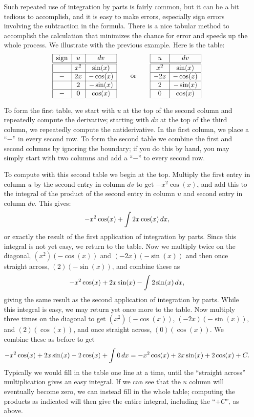 Such repeated use of integration by parts is fairly common, but it can
be a bit tedious to accomplish, and it is easy to make
errors, especially sign errors involving the subtraction in the
formula. There is a nice tabular method to accomplish the calculation
that minimizes the chance for error and speeds up the whole
process. We illustrate with the previous example. Here is the
table:
\[
\begin{array}{|c|c|c|}\hline
\text{sign} & u & dv \\ \hline \hline
 & x^2 & \sin(x) \\ \hline
- & 2x & -\cos(x) \\ \hline
  & 2  & -\sin(x) \\ \hline
- & 0  & \cos(x) \\ \hline
\end{array}
\qquad\text{or}\qquad
\begin{array}{|c|c|}\hline
u & dv \\ \hline\hline
x^2 & \sin(x) \\ \hline 
-2x & -\cos(x) \\\hline
2 & -\sin(x)\\\hline
0 & \cos(x)\\\hline
\end{array}
\]

To form the first table, we start with $u$ at the top of the second
column and repeatedly compute the derivative; starting with $dv$ at
the top of the third column, we repeatedly compute the
antiderivative. In the first column, we place a ``$-$'' in every
second row. To form the second table we combine the first and second
columns by ignoring the boundary; if you do this by hand, you may
simply start with two columns and add a ``$-$'' to every second row.

To compute with this second table we begin at the top. Multiply the
first entry in column $u$ by the second entry in column $dv$ to get
$-x^2\cos(x)$, and add this to the integral of the product of the
second entry in column $u$ and second entry in column $dv$.  This
gives:
$$-x^2\cos(x)+\int 2x\cos(x)\, d x,$$
or exactly the result of the first application of integration by
parts.  Since this integral is not yet easy, we return to the table.
Now we multiply twice on the diagonal, $(x^2)(-\cos(x))$ and
$(-2x)(-\sin(x))$ and then once straight across, $(2)(-\sin(x))$, and
combine these as
\[
-x^2\cos(x)+2x\sin(x)-\int 2\sin(x)\, d x,
\]
giving the same result as the second application of integration by
parts. While this integral is easy, we may return yet once more to the
table. Now multiply three times on the diagonal to get
$(x^2)(-\cos(x))$, $(-2x)(-\sin(x))$, and $(2)(\cos(x))$, and once
straight across, $(0)(\cos(x))$. We combine these as before to get
\[
  -x^2\cos(x)+2x\sin(x) +2\cos(x)+\int 0\, d x=
  -x^2\cos(x)+2x\sin(x) +2\cos(x)+C.
\]
Typically we would fill in the table one line at a time, until the
``straight across'' multiplication gives an easy integral. If we can
see that the $u$ column will eventually become zero, we can instead
fill in the whole table; computing the products as indicated will then
give the entire integral, including the ``$+C$'', as above.

